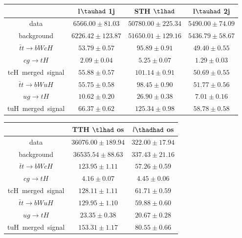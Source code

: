 \centering
\begin{tabular}{|c|c|c|c|} \hline
 & l$\tauhad$ 1j   & STH $\tlhad$    & l$\tauhad$ 2j  \\\hline
data & $6566.00\pm81.03$ & $50780.00\pm225.34$ & $5490.00\pm74.09$\\\hline
background & $6226.42\pm123.87$ & $51650.01\pm129.16$ & $5436.79\pm58.67$\\\hline
$\bar{t}t\to bWcH$ & $53.79\pm0.57$ & $95.89\pm0.91$ & $49.40\pm0.55$\\\hline
$cg\to tH$ & $2.09\pm0.04$ & $5.25\pm0.07$ & $1.29\pm0.03$\\\hline
tcH~merged~signal & $55.88\pm0.57$ & $101.14\pm0.91$ & $50.69\pm0.55$\\\hline
$\bar{t}t\to bWuH$ & $55.75\pm0.58$ & $98.45\pm0.90$ & $51.77\pm0.56$\\\hline
$ug\to tH$ & $10.62\pm0.20$ & $26.90\pm0.38$ & $7.01\pm0.16$\\\hline
tuH~merged~signal & $66.37\pm0.62$ & $125.34\pm0.98$ & $58.78\pm0.58$\\\hline
\end{tabular}
\begin{tabular}{|c|c|c|} \hline
 & TTH $\tlhad$ os   & $l\thadhad$ os\\\hline
data & $36076.00\pm189.94$ & $322.00\pm17.94$\\\hline
background & $36535.54\pm88.63$ & $337.43\pm21.16$\\\hline
$\bar{t}t\to bWcH$ & $123.95\pm1.11$ & $57.26\pm0.59$\\\hline
$cg\to tH$ & $4.16\pm0.07$ & $4.45\pm0.06$\\\hline
tcH~merged~signal & $128.11\pm1.11$ & $61.71\pm0.59$\\\hline
$\bar{t}t\to bWuH$ & $129.95\pm1.10$ & $59.88\pm0.60$\\\hline
$ug\to tH$ & $23.35\pm0.38$ & $20.67\pm0.28$\\\hline
tuH~merged~signal & $153.31\pm1.17$ & $80.55\pm0.66$\\\hline
\end{tabular}
